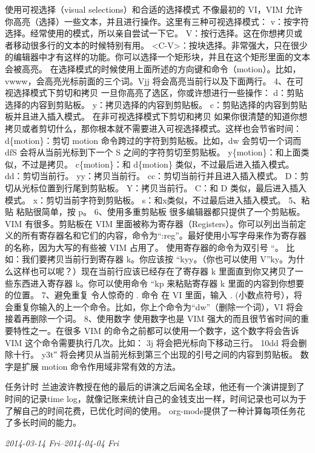 \documentclass[11pt]{article}
\begin{document}
    使用可视选择（visual selections）和合适的选择模式
    不像最初的 VI，VIM 允许你高亮（选择）一些文本，并且进行操作。这里有三种可视选择模式：
    v：按字符选择。经常使用的模式，所以亲自尝试一下它。
    V：按行选择。这在你想拷贝或者移动很多行的文本的时候特别有用。
    <C-V>：按块选择。非常强大，只在很少的编辑器中才有这样的功能。你可以选择一个矩形块，并且在这个矩形里面的文本会被高亮。
    在选择模式的时候使用上面所述的方向键和命令（motion）。比如，vwww，会高亮光标前面的三个词。Vjj 将会高亮当前行以及下面两行。
    4、在可视选择模式下剪切和拷贝
    一旦你高亮了选区，你或许想进行一些操作：
    d：剪贴选择的内容到剪贴板。
    y：拷贝选择的内容到剪贴板。
    c：剪贴选择的内容到剪贴板并且进入插入模式。
    在非可视选择模式下剪切和拷贝
    如果你很清楚的知道你想拷贝或者剪切什么，那你根本就不需要进入可视选择模式。这样也会节省时间：
    d\{motion\}：剪切 motion 命令跨过的字符到剪贴板。比如，dw 会剪切一个词而 dfS 会将从当前光标到下一个 S 之间的字符剪切至剪贴板。
    y\{motion\}：和上面类似，不过是拷贝。
    c\{motion\}：和 d\{motion\} 类似，不过最后进入插入模式。
    dd：剪切当前行。
    yy：拷贝当前行。
    cc：剪切当前行并且进入插入模式。
    D：剪切从光标位置到行尾到剪贴板。
    Y：拷贝当前行。
    C：和 D 类似，最后进入插入模式。
    x：剪切当前字符到剪贴板。
    s：和x类似，不过最后进入插入模式。
    5、粘贴
    粘贴很简单，按 p。
    6、使用多重剪贴板
    很多编辑器都只提供了一个剪贴板。VIM 有很多。剪贴板在 VIM 里面被称为寄存器（Registers）。你可以列出当前定义的所有寄存器名和它们的内容，命令为“:reg”。最好使用小写字母来作为寄存器的名称，因为大写的有些被 VIM 占用了。
    使用寄存器的命令为双引号 “。
    比如：我们要拷贝当前行到寄存器 k。你应该按 “kyy。（你也可以使用 V”ky。为什么这样也可以呢？）现在当前行应该已经存在了寄存器 k 里面直到你又拷贝了一些东西进入寄存器 k。你可以使用命令 “kp 来粘贴寄存器 k 里面的内容到你想要的位置。
    7、避免重复
    令人惊奇的 . 命令
    在 VI 里面，输入 . (小数点符号），将会重复你输入的上一个命令。比如，你上个命令为“dw”（删除一个词），VI 将会接着再删除一个词。
    8、使用数字
    使用数字也是 VIM 强大的而且很节省时间的重要特性之一。在很多 VIM 的命令之前都可以使用一个数字，这个数字将会告诉 VIM 这个命令需要执行几次。比如：
    3j 将会把光标向下移动三行。
    10dd 将会删除十行。
    y3t″ 将会拷贝从当前光标到第三个出现的引号之间的内容到剪贴板。
    数字是扩展 motion 命令作用域非常有效的方法。

    任务计时
    兰迪波许教授在他的最后的讲演之后闻名全球，他还有一个演讲提到了时间的记录time log，就像记账来统计自己的金钱支出一样，时间记录也可以为于了解自己的时间花费，已优化时间的使用。
    org-mode提供了一种计算每项任务花了多长时间的能力。


    \textit{2014-03-14 Fri}--\textit{2014-04-04 Fri}
\end{document}
